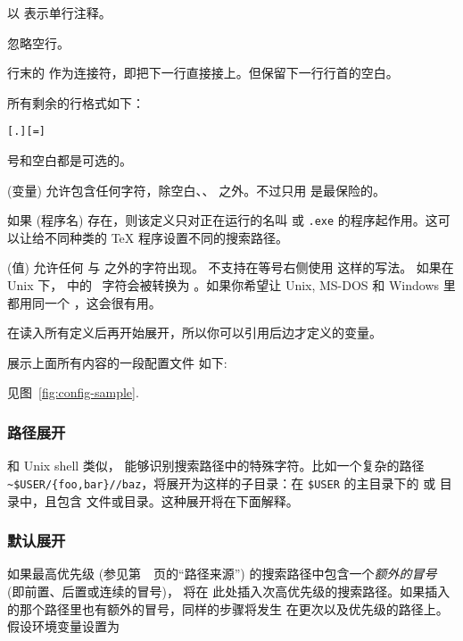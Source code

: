 \documentclass{article}
\begin{document}
\begin{itemize*}
\item
  以 \code{\%} 表示单行注释。
\item
  忽略空行。
\item
  行末的 \bs{} 作为连接符，即把下一行直接接上。但保留下一行行首的空白。
\item
  所有剩余的行格式如下：
\begin{alltt}
  [.] [=] 
\end{alltt}%
 \samp{=} 号和空白都是可选的。
\item
   (变量) 允许包含任何字符，除空白、\samp{=}、
  之外。不过只用  是最保险的。
\item
  如果  (程序名) 存在，则该定义只对正在运行的名叫
  \texttt{} 或 \texttt{.exe}
  的程序起作用。这可以让给不同种类的 \TeX{} 程序设置不同的搜索路径。
\item {} (值) 允许任何 \code{\%} 与  之外的字符出现。
  不支持在等号右侧使用  这样的写法。
  如果在 Unix 下， 中的 \samp{;}\ 字符会被转换为
  \samp{:}。如果你希望让 Unix, MS-DOS 和 Windows 里都用同一个
  ，这会很有用。
\item
  在读入所有定义后再开始展开，所以你可以引用后边才定义的变量。
\end{itemize*}
展示上面所有内容的一段配置文件
\ifSingleColumn
如下:


\else
见图~\ref{fig:config-sample}.
\fi

\subsubsection{路径展开}
\label{sec:path-expansion}

和 Unix shell 类似，\KPS{} 能够识别搜索路径中的特殊字符。比如一个复杂的路径
\verb+~$USER/{foo,bar}//baz+，将展开为这样的子目录：在 \texttt{\$USER}
的主目录下的  或  目录中，且包含 
文件或目录。这种展开将在下面解释。
\subsubsection{默认展开}
\label{sec:default-expansion}

如果最高优先级 (参见第~\pageref{sec:path-sources}~页的``路径来源'')
的搜索路径中包含一个\emph{额外的冒号} (即前置、后置或连续的冒号)，\KPS{} 将在
此处插入次高优先级的搜索路径。如果插入的那个路径里也有额外的冒号，同样的步骤将发生
在更次以及优先级的路径上。假设环境变量设置为
\end{document}
